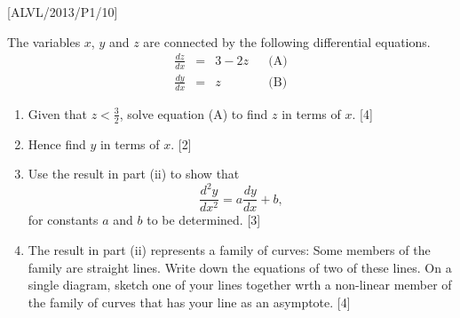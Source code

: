 \item {[}ALVL/2013/P1/10{]}

The variables $x$, $y$ and $z$ are connected by the following differential
equations. 
\[
\begin{array}{ccccc}
\frac{dz}{dx} & = & 3-2z &  & \text{(A)}\\
\frac{dy}{dx} & = & z &  & \text{(B)}
\end{array}
\]

\begin{enumerate}
\item Given that $z<\frac{3}{2}$, solve equation (A) to find $z$ in terms
of $x$. \hfill{}{[}4{]}
\item Hence find $y$ in terms of $x$. \hfill{} {[}2{]}
\item Use the result in part (ii) to show that 
\[
\frac{d^{2}y}{dx^{2}}=a\frac{dy}{dx}+b,
\]
for constants $a$ and $b$ to be determined. \hfill{} {[}3{]}
\item The result in part (ii) represents a family of curves: Some members
of the family are straight lines. Write down the equations of two
of these lines. On a single diagram, sketch one of your lines together
wrth a non-linear member of the family of curves that has your line
as an asymptote. \hfill{}{[}4{]}
\end{enumerate}
